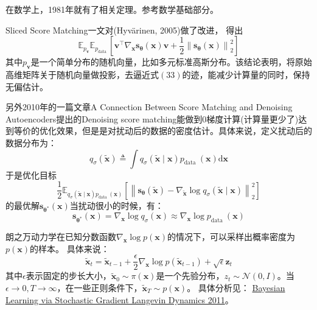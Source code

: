 在数学上，1981年就有了相关定理。参考数学基础部分。

Sliced Score Matching一文对(Hyvärinen, 2005)做了改进，
得出
\begin{equation}
\mathbb{E}_{p_{\mathbf{v}}} \mathbb{E}_{p_{\text {data }}}\left[\mathbf{v}^{\top} \nabla_{\mathbf{x}} \mathbf{s}_{\boldsymbol{\theta}}(\mathbf{x}) \mathbf{v}+\frac{1}{2}\left\|\mathbf{s}_{\boldsymbol{\theta}}(\mathbf{x})\right\|_2^2\right]
\end{equation}
其中$p_{\mathbf{v}}$是一个简单分布的随机向量，比如多元标准高斯分布。该结论表明，将原始高维矩阵关于随机向量做投影，去逼近式$(33)$的迹，能减少计算量的同时，保持无偏估计。

另外2010年的一篇文章A Connection Between Score Matching and Denoising Autoencoders提出的Denoising score matching能做到0梯度计算(计算量更少了)达到等价的优化效果，但是是对扰动后的数据的密度估计。具体来说，定义扰动后的数据分布为：
\begin{equation}
q_\sigma(\tilde{\mathbf{x}}) \triangleq \int q_\sigma(\tilde{\mathbf{x}} \mid \mathbf{x}) p_{\text {data }}(\mathbf{x}) \mathrm{d} \mathbf{x}
\end{equation}
于是优化目标
\begin{equation}
\frac{1}{2} \mathbb{E}_{q_\sigma(\tilde{\mathbf{x}} \mid \mathbf{x}) p_{\text {data }}(\mathbf{x})}\left[\left\|\mathbf{s}_{\boldsymbol{\theta}}(\tilde{\mathbf{x}})-\nabla_{\tilde{\mathbf{x}}} \log q_\sigma(\tilde{\mathbf{x}} \mid \mathbf{x})\right\|_2^2\right]
\end{equation}
的最优解$\mathbf{s}_{\boldsymbol{\theta}^*}(\mathbf{x})$当扰动很小的时候，有：
\begin{equation}
\mathbf{s}_{\boldsymbol{\theta}^*}(\mathbf{x})=\nabla_{\mathbf{x}} \log q_\sigma(\mathbf{x}) \approx \nabla_{\mathbf{x}} \log p_{\text {data }}(\mathbf{x})
\end{equation}

朗之万动力学在已知分数函数$\nabla_{\mathbf{x}} \log p(\mathbf{x})$的情况下，可以采样出概率密度为$p(\mathbf{x})$的样本。
具体来说：
\begin{equation}
\tilde{\mathbf{x}}_t=\tilde{\mathbf{x}}_{t-1}+\frac{\epsilon}{2} \nabla_{\mathbf{x}} \log p\left(\tilde{\mathbf{x}}_{t-1}\right)+\sqrt{\epsilon} \mathbf{z}_t
\end{equation}
其中$\epsilon$表示固定的步长大小，$\tilde{\mathbf{x}}_0 \sim \pi(\mathbf{x})$是一个先验分布，$z_t \sim \mathcal{N}(0, I)$。当$\epsilon \rightarrow 0, T \rightarrow \infty$，在一些正则条件下，$
\tilde{\mathbf{x}}_T \sim p(\mathbf{x})$。
具体分析见：
\href{https://www.stats.ox.ac.uk/~teh/research/compstats/WelTeh2011a.pdf}{Bayesian Learning via Stochastic Gradient Langevin Dynamics 2011}。

